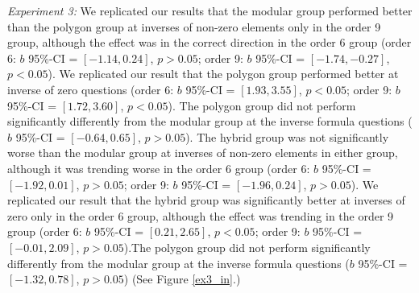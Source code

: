 \documentclass[man,mask,10pt]{apa6}
\begin{document}
\textit{Experiment 3:} We replicated our results that the modular group performed better than the polygon group at inverses of non-zero elements only in the order 9 group, although the effect was in the correct direction in the order 6 group (order 6: $b$ 95\%-CI = $[-1.14,0.24]$, $p > 0.05$; order 9: $b$ 95\%-CI = $[-1.74,-0.27]$, $p < 0.05$). We replicated our result that the polygon group performed better at inverse of zero questions (order 6: $b$ 95\%-CI = $[1.93,3.55]$, $p < 0.05$; order 9: $b$ 95\%-CI = $[1.72,3.60]$, $p < 0.05$). The polygon group did not perform significantly differently from the modular group at the inverse formula questions ($b$ 95\%-CI = $[-0.64,0.65]$, $p > 0.05$). The hybrid group was not significantly worse than the modular group at inverses of non-zero elements in either group, although it was trending worse in the order 6 group (order 6: $b$ 95\%-CI = $[-1.92,0.01]$, $p > 0.05$; order 9: $b$ 95\%-CI = $[-1.96,0.24]$, $p > 0.05$). We replicated our result that the hybrid group was significantly better at inverses of zero only in the order 6 group, although the effect was trending in the order 9 group (order 6: $b$ 95\%-CI = $[0.21,2.65]$, $p < 0.05$; order 9: $b$ 95\%-CI = $[-0.01,2.09]$, $p > 0.05$).The polygon group did not perform significantly differently from the modular group at the inverse formula questions ($b$ 95\%-CI = $[-1.32,0.78]$, $p > 0.05$) (See Figure \ref{ex3_in}.) \par
\end{document}
